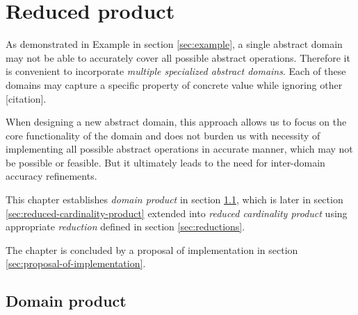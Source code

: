 \documentclass[12pt,oneside]{fithesis2}
\theoremstyle{definition}
\begin{document}
\chapter{Reduced product}

As demonstrated in Example in section \ref{sec:example}, a single abstract domain may not be able to accurately cover all possible abstract operations. Therefore it is convenient to incorporate \textit{multiple specialized abstract domains}. Each of these domains may capture a specific property of concrete value while ignoring other [citation].

When designing a new abstract domain, this approach allows us to focus on the core functionality of the domain and does not burden us with necessity of implementing all possible abstract operations in accurate manner, which may not be possible or feasible. But it ultimately leads to the need for inter-domain accuracy refinements.

This chapter establishes \textit{domain product} in section \ref{sec:domain-product}, which is later in section \ref{sec:reduced-cardinality-product} extended into \textit{reduced cardinality product} using appropriate \textit{reduction} defined in section \ref{sec:reductions}.

The chapter is concluded by a proposal of implementation in section \ref{sec:proposal-of-implementation}.




\section{Domain product}\label{sec:domain-product}
\end{document}
